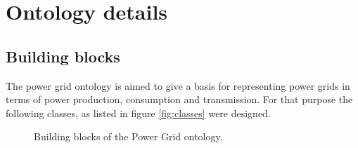 \section{Ontology details}

\subsection{Building blocks}

The power grid ontology is aimed to give a basis for representing power grids in terms of power production, consumption and transmission. For that purpose the following classes, as listed in figure \ref{fig:classes} were designed. 

\begin{figure}[h]
\centering
{} 
\caption{Building blocks of the Power Grid ontology.}
\end{figure}

\newpage

